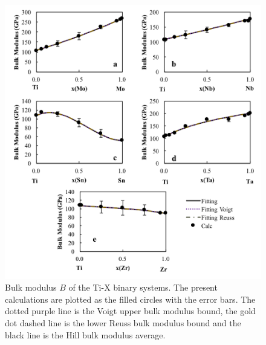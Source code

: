 \pagebreak
\begin{figure}[H]
	\centering
	\includegraphics[width=\textwidth]{Chapter-5/Figures/tixbulk.png}
	\caption{Bulk modulus $B$ of the Ti-X binary systems. The present calculations are plotted as the filled circles with the error bars. The dotted purple line is the Voigt upper bulk modulus bound, the gold dot dashed line is the lower Reuss bulk modulus bound and the black line is the Hill bulk modulus average.}
	\label{Ch5-figure:tixbulk}
\end{figure}


